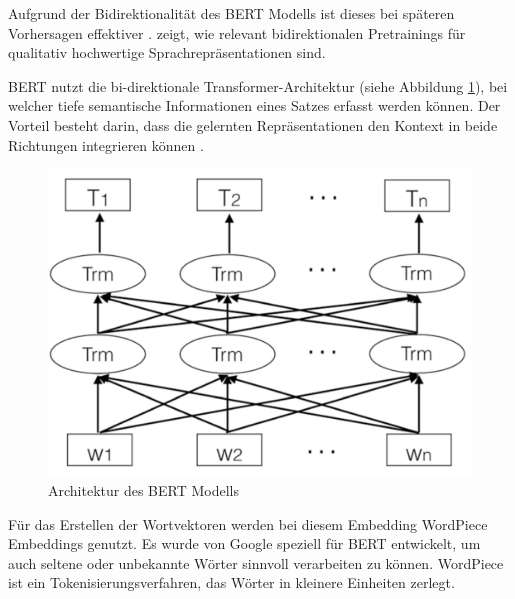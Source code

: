 Aufgrund der Bidirektionalität des BERT Modells ist dieses bei späteren Vorhersagen effektiver \cite{wettig2023}. 
\cite{devlin2019} zeigt, wie relevant bidirektionalen Pretrainings für qualitativ hochwertige Sprachrepräsentationen sind.

BERT nutzt die bi-direktionale Transformer-Architektur (siehe Abbildung \ref{fig:architecture_bert}), bei welcher tiefe semantische Informationen 
eines Satzes erfasst werden können.
Der Vorteil besteht darin, dass die gelernten Repräsentationen den Kontext in beide Richtungen integrieren können \cite{Wang:2020aa}.

\begin{figure}[htbp]
    \begin{center}
        \includegraphics[scale=0.3]{static/architecture_bert.png}
        \caption{\label{fig:architecture_bert} Architektur des BERT Modells \cite{Wang:2020aa}}
    \end{center}
\end{figure}

Für das Erstellen der Wortvektoren werden bei diesem Embedding WordPiece Embeddings genutzt.
Es wurde von Google speziell für BERT entwickelt, um auch seltene oder unbekannte Wörter sinnvoll verarbeiten zu können.
WordPiece ist ein Tokenisierungsverfahren, das Wörter in kleinere Einheiten zerlegt.

